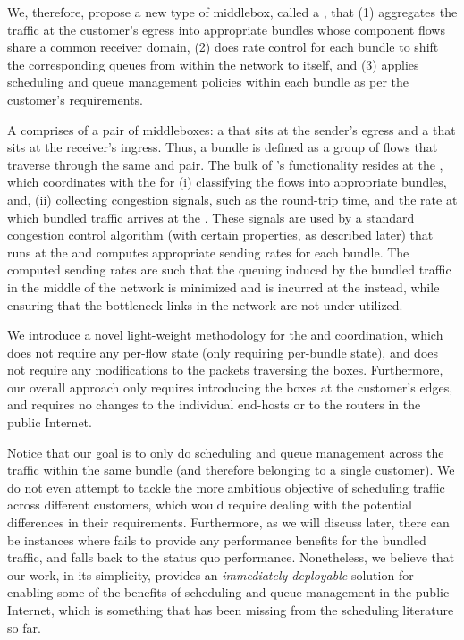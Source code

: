 We, therefore, propose a new type of middlebox, called a \name, that (1) aggregates the traffic at the customer's egress into appropriate bundles whose component flows share a common receiver domain, (2) does rate control for each bundle to shift the corresponding queues from within the network to itself, and (3) applies scheduling and queue management policies within each bundle as per the customer's requirements. 

 A \name comprises of a pair of middleboxes: a \inbox that sits at the sender's egress and a \outbox that sits at the receiver's ingress. Thus, a bundle is defined as a group of flows that traverse through the same \inbox and \outbox pair. The bulk of \name's functionality resides at the \inbox, which coordinates with the \outbox for (i) classifying the flows into appropriate bundles, and,  (ii) collecting congestion signals, such as the round-trip time, and the rate at which bundled traffic arrives at the \outbox. These signals are used by a standard congestion control algorithm (with certain properties, as described later) that runs at the \inbox and computes appropriate sending rates for each bundle. The computed sending rates are such that the queuing induced by the bundled traffic in the middle of the network is minimized and is incurred at the \inbox instead, while ensuring that the bottleneck links in the network are not under-utilized. 
 
 We introduce a novel light-weight methodology for the \inbox and \outbox coordination, which does not require any per-flow state (only requiring per-bundle state), and does not require any modifications to the packets traversing the \name boxes. Furthermore, our overall approach only requires introducing the \name boxes at the customer's edges, and requires no changes to the individual end-hosts or to the routers in the public Internet. 
 
 Notice that our goal is to only do scheduling and queue management across the traffic within the same bundle (and therefore belonging to a single customer). We do not even attempt to tackle the more ambitious objective of  scheduling traffic across different customers, which would require dealing with the potential differences in their requirements. Furthermore, as we will discuss later, there can be instances where \name fails to provide any performance benefits for the bundled traffic, and falls back to the status quo performance. Nonetheless, we believe that our work, in its simplicity, provides an \emph{immediately deployable} solution for enabling some of the benefits of scheduling and queue management in the public Internet, which is something that has been missing from the scheduling literature so far. 


